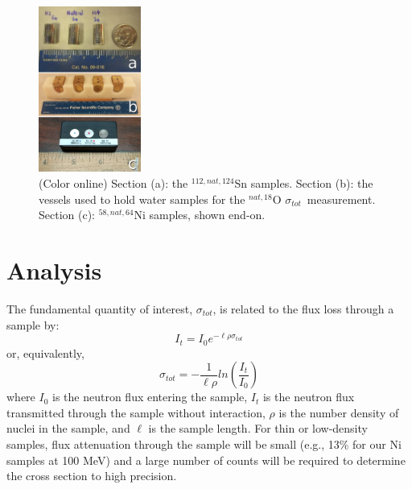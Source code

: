 \documentclass[twocolumn,secnumarabic,amssymb, nobibnotes, aps, prl,
superscriptaddress, nobalancelastpage]{revtex4}
\newcommand{\tot}{\ensuremath{\sigma_{tot}}}
\begin{document}
\begin{figure}
    \includegraphics[width=0.3\textwidth]{figures/AllIsotopicSamples.jpg}
    \caption{(Color online) Section (a): the ${^{112,nat,124}}$Sn samples. Section (b): the 
        vessels used to hold water samples for the ${^{nat, 18}}$O \tot\  measurement. 
        Section (c): ${^{58,nat,64}}$Ni samples, shown end-on.}
    \label{SamplesImage}
\end{figure}

\section{Analysis}

The fundamental quantity of interest, \tot, is related to the flux
loss through a sample by:
\begin{equation}
I_{t} = I_{0}e^{-{\ell\rho\sigma_{tot}}}
\end{equation}
or, equivalently,
\begin{equation}
    \tot = -\frac{1}{\ell\rho}ln\left(\frac{I_{t}}{I_{0}}\right)
\end{equation}
where $I_{0}$ is the neutron flux entering the sample, $I_{t}$ is the neutron
flux transmitted through the sample without interaction, $\rho$ is the number
density of nuclei in the sample, and $\ell$ is the sample length. For thin
or low-density samples, flux attenuation through the sample will be small
(e.g., 13\% for our Ni samples at 100 MeV) and a large number
of counts will be required to determine the cross section to high
precision.
\end{document}
